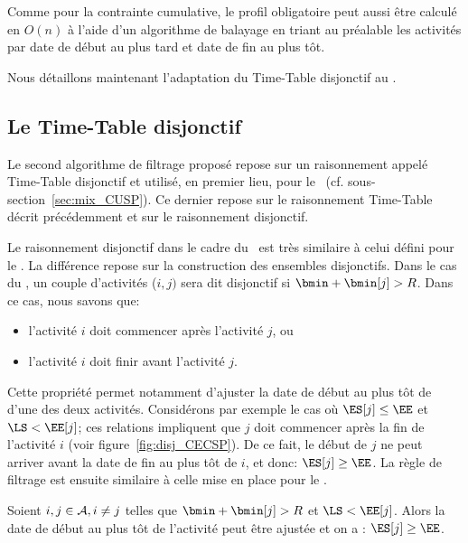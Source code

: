 Comme pour la contrainte cumulative, le profil obligatoire peut aussi
être calculé en $O(n)$ à l'aide d'un algorithme de balayage en triant
au préalable les activités par date de début au plus tard et date de
fin au plus tôt.

Nous détaillons maintenant l'adaptation du Time-Table disjonctif au
\CECSP. 

\subsection{Le Time-Table disjonctif}
\label{sec:TTDR_CECSP}

Le second algorithme de filtrage proposé repose sur un raisonnement
appelé Time-Table disjonctif et utilisé, en premier lieu, pour le
\CUSP~(cf. sous-section~\ref{sec:mix_CUSP}). Ce dernier repose sur le
raisonnement Time-Table décrit précédemment et sur le raisonnement
disjonctif.

Le raisonnement disjonctif dans le cadre du \CECSP~est très similaire
à celui défini pour le \CUSP. La différence repose sur la construction
des ensembles disjonctifs. Dans le cas du \CECSP, un couple
d'activités ($i,j)$ sera dit disjonctif si $\bmin+\bmin[j] >R$. Dans
ce cas, nous savons que:
\begin{itemize}
\item l'activité $i$ doit commencer après l'activité $j$, ou 
\item l'activité $i$ doit finir avant l'activité $j$.  
\end{itemize}

Cette propriété permet notamment d'ajuster la date de début au
plus tôt de d'une des deux activités. Considérons par exemple le cas
où $\ES[j] \le \EE$ et $\LS < \EE[j]$; ces relations 
impliquent que $j$ doit commencer après la fin de l'activité $i$ (voir
figure~\ref{fig:disj_CECSP}). De ce fait, le début de $j$ ne peut
arriver avant la date de fin au plus tôt de $i$, et donc: $\ES[j] \ge
\EE$. La règle de filtrage est ensuite similaire à celle mise en place
pour le \CUSP.

\begin{reg}
Soient $i, j \in {\cal A}, i \neq j$ telles que $\bmin+\bmin[j] > R$ et $\LS
< \EE[j]$. Alors la date de début au plus tôt de l’activité peut être
ajustée et on a : $\ES[j] \ge \EE$.
\end{reg}

